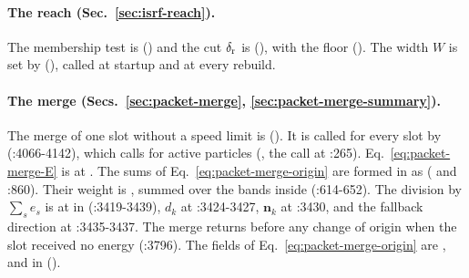 \paragraph{The reach (Sec.~\ref{sec:isrf-reach}).} The membership test is
 () and the
cut $\delta_{\rm r}$ is 
(), with the floor
 (). The
width $W$ is set by 
(), called at startup and at every rebuild.

\paragraph{The merge (Secs.~\ref{sec:packet-merge}, \ref{sec:packet-merge-summary}).} The merge of one slot
without a speed limit is 
(). It is called for every slot by
 (:4066-4142), which
 calls for active particles
(, the call at :265).
Eq.~\eqref{eq:packet-merge-E} is at . The
sums of Eq.~\eqref{eq:packet-merge-origin} are formed in
 as 
( and :860). Their weight is
, summed over the bands inside
 (:614-652). The division by
$\sum_s e_s$ is at  in
 (:3419-3439), $d_k$ at :3424-3427,
$\boldsymbol{n}_k$ at :3430, and the fallback direction at :3435-3437. The
merge returns before any change of origin when the slot received no energy
(:3796). The fields of Eq.~\eqref{eq:packet-merge-origin} are
,  and  in
 ().

